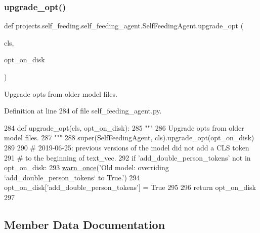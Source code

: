 \subsubsection{\texorpdfstring{upgrade\+\_\+opt()}{upgrade\_opt()}}
{\footnotesize\ttfamily def projects.\+self\+\_\+feeding.\+self\+\_\+feeding\+\_\+agent.\+Self\+Feeding\+Agent.\+upgrade\+\_\+opt (\begin{DoxyParamCaption}\item[{}]{cls,  }\item[{}]{opt\+\_\+on\+\_\+disk }\end{DoxyParamCaption})}

\begin{DoxyVerb}Upgrade opts from older model files.
\end{DoxyVerb}
 

Definition at line 284 of file self\+\_\+feeding\+\_\+agent.\+py.


\begin{DoxyCode}
284     \textcolor{keyword}{def }upgrade\_opt(cls, opt\_on\_disk):
285         \textcolor{stringliteral}{"""}
286 \textcolor{stringliteral}{        Upgrade opts from older model files.}
287 \textcolor{stringliteral}{        """}
288         super(SelfFeedingAgent, cls).upgrade\_opt(opt\_on\_disk)
289 
290         \textcolor{comment}{# 2019-06-25: previous versions of the model did not add a CLS token}
291         \textcolor{comment}{# to the beginning of text\_vec.}
292         \textcolor{keywordflow}{if} \textcolor{stringliteral}{'add\_double\_person\_tokens'} \textcolor{keywordflow}{not} \textcolor{keywordflow}{in} opt\_on\_disk:
293             \hyperlink{namespaceparlai_1_1utils_1_1misc_a884a3aefa90581f53bc592fa6a78dc43}{warn\_once}(\textcolor{stringliteral}{'Old model: overriding `add\_double\_person\_tokens` to True.'})
294             opt\_on\_disk[\textcolor{stringliteral}{'add\_double\_person\_tokens'}] = \textcolor{keyword}{True}
295 
296         \textcolor{keywordflow}{return} opt\_on\_disk
297 
\end{DoxyCode}


\subsection{Member Data Documentation}
\mbox{\label{classprojects_1_1self__feeding_1_1self__feeding__agent_1_1SelfFeedingAgent_a02d034bc0c9208fb3d6561b90f176ddf}} 
